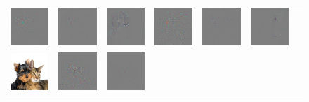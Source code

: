 \begin{figure}
\begin{center}
\begin{tabular}{c||ccc||ccc}
\includegraphics[width=0.13\linewidth]{figs/examples/googlenet/oxford/dog-cat2_diff_163} &
\includegraphics[width=0.13\linewidth]{figs/examples/googlenet/deconv/dog-cat2_diff_163} &
\includegraphics[width=0.13\linewidth]{figs/examples/googlenet/soft/dog-cat2_diff_163} &
\includegraphics[width=0.13\linewidth]{figs/examples/googlenet/oxford/dog-cat2_diff_286} &
\includegraphics[width=0.13\linewidth]{figs/examples/googlenet/deconv/dog-cat2_diff_286} &
\includegraphics[width=0.13\linewidth]{figs/examples/googlenet/soft/dog-cat2_diff_286} \\
\includegraphics[width=0.13\linewidth]{figs/examples/googlenet/oxford/dog-cat3} &
\includegraphics[width=0.13\linewidth]{figs/examples/googlenet/oxford/dog-cat3_diff_188} &
\includegraphics[width=0.13\linewidth]{figs/examples/googlenet/deconv/dog-cat3_diff_188} &

\end{tabular}
\end{center}
\end{figure}
